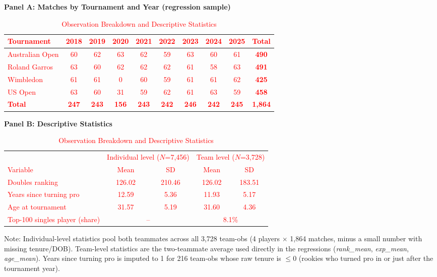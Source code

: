 \documentclass[10pt]{article}
\begin{document}
\begin{table}[htbp]
\color{blue}
\centering
\caption{Observation Breakdown and Descriptive Statistics}
\label{tab:t1}
\begin{threeparttable}
\textbf{Panel A: Matches by Tournament and Year (regression sample)}\\[2pt]
\textcolor{red}{
\begin{tabular}{lccccccccc}
\toprule
Tournament & 2018 & 2019 & 2020 & 2021 & 2022 & 2023 & 2024 & 2025 & \textbf{Total} \\
\midrule
Australian Open & 60 & 62 & 63 & 62 & 59 & 63 & 60 & 61 & \textbf{490} \\
Roland Garros    & 63 & 60 & 62 & 62 & 62 & 61 & 58 & 63 & \textbf{491} \\
Wimbledon        & 61 & 61 & 0  & 60 & 59 & 61 & 61 & 62 & \textbf{425} \\
US Open          & 63 & 60 & 31 & 59 & 62 & 61 & 63 & 59 & \textbf{458} \\
\midrule
\textbf{Total} & \textbf{247} & \textbf{243} & \textbf{156} & \textbf{243} & \textbf{242} & \textbf{246} & \textbf{242} & \textbf{245} & \textbf{1,864} \\
\bottomrule
\end{tabular}
}

\vspace{10pt}
\textbf{Panel B: Descriptive Statistics}\\[2pt]
\textcolor{red}{
\begin{tabular}{lcccc}
\toprule
 & \multicolumn{2}{c}{Individual level ($N$=7,456)} & \multicolumn{2}{c}{Team level ($N$=3,728)} \\
Variable & Mean & SD & Mean & SD \\
\midrule
Doubles ranking            & 126.02 & 210.46 & 126.02 & 183.51 \\
Years since turning pro    & 12.59  & 5.36   & 11.93  & 5.17   \\
Age at tournament          & 31.57  & 5.19   & 31.60  & 4.36   \\
Top-100 singles player (share) & \multicolumn{2}{c}{--} & \multicolumn{2}{c}{8.1\%} \\
\bottomrule
\end{tabular}
}
\begin{tablenotes}
\small
\item Note: Individual-level statistics pool both teammates across all 3,728 team-obs (4 players $\times$ 1,864 matches, minus a small number with missing tenure/DOB). Team-level statistics are the two-teammate average used directly in the regressions (\textit{rank\_mean}, \textit{exp\_mean}, \textit{age\_mean}). Years since turning pro is imputed to 1 for 216 team-obs whose raw tenure is $\le 0$ (rookies who turned pro in or just after the tournament year). %
\end{tablenotes}
\end{threeparttable}
\end{table}
\end{document}

